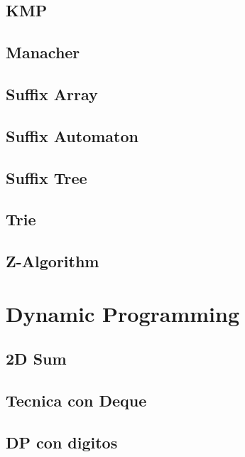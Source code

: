 \subsection{KMP}
\raggedbottom
\hrulefill
\subsection{Manacher}
\raggedbottom
\hrulefill
\subsection{Suffix Array}
\raggedbottom
\hrulefill
\subsection{Suffix Automaton}
\raggedbottom
\hrulefill
\subsection{Suffix Tree}
\raggedbottom
\hrulefill
\subsection{Trie}
\raggedbottom
\hrulefill
\subsection{Z-Algorithm}
\raggedbottom
\hrulefill
\newpage

\section{Dynamic Programming}
\subsection{2D Sum}
\raggedbottom
\hrulefill
\subsection{Tecnica con Deque}
\raggedbottom
\hrulefill
\subsection{DP con digitos}
\raggedbottom
\hrulefill
